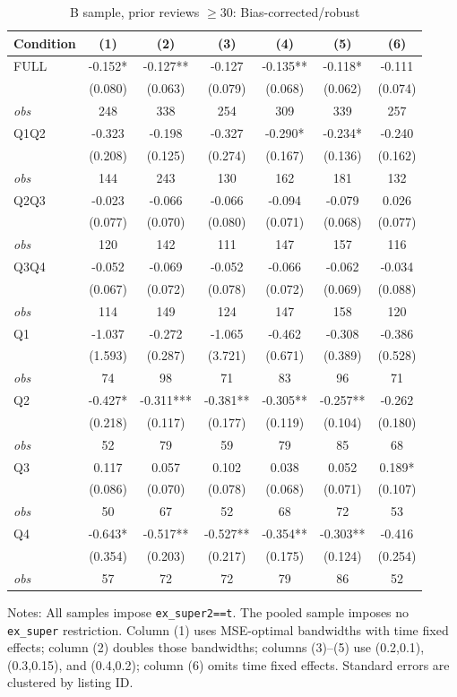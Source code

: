 \begin{table}[!htbp]
\centering
\caption{B sample, prior reviews $\geq30$: Bias-corrected/robust}
\begin{tabular}{lcccccc}
\toprule
Condition & (1) & (2) & (3) & (4) & (5) & (6) \\
\midrule
FULL & -0.152* & -0.127** & -0.127 & -0.135** & -0.118* & -0.111 \\
 & (0.080) & (0.063) & (0.079) & (0.068) & (0.062) & (0.074) \\
\textit{obs} & 248 & 338 & 254 & 309 & 339 & 257 \\
Q1Q2 & -0.323 & -0.198 & -0.327 & -0.290* & -0.234* & -0.240 \\
 & (0.208) & (0.125) & (0.274) & (0.167) & (0.136) & (0.162) \\
\textit{obs} & 144 & 243 & 130 & 162 & 181 & 132 \\
Q2Q3 & -0.023 & -0.066 & -0.066 & -0.094 & -0.079 & 0.026 \\
 & (0.077) & (0.070) & (0.080) & (0.071) & (0.068) & (0.077) \\
\textit{obs} & 120 & 142 & 111 & 147 & 157 & 116 \\
Q3Q4 & -0.052 & -0.069 & -0.052 & -0.066 & -0.062 & -0.034 \\
 & (0.067) & (0.072) & (0.078) & (0.072) & (0.069) & (0.088) \\
\textit{obs} & 114 & 149 & 124 & 147 & 158 & 120 \\
Q1 & -1.037 & -0.272 & -1.065 & -0.462 & -0.308 & -0.386 \\
 & (1.593) & (0.287) & (3.721) & (0.671) & (0.389) & (0.528) \\
\textit{obs} & 74 & 98 & 71 & 83 & 96 & 71 \\
Q2 & -0.427* & -0.311*** & -0.381** & -0.305** & -0.257** & -0.262 \\
 & (0.218) & (0.117) & (0.177) & (0.119) & (0.104) & (0.180) \\
\textit{obs} & 52 & 79 & 59 & 79 & 85 & 68 \\
Q3 & 0.117 & 0.057 & 0.102 & 0.038 & 0.052 & 0.189* \\
 & (0.086) & (0.070) & (0.078) & (0.068) & (0.071) & (0.107) \\
\textit{obs} & 50 & 67 & 52 & 68 & 72 & 53 \\
Q4 & -0.643* & -0.517** & -0.527** & -0.354** & -0.303** & -0.416 \\
 & (0.354) & (0.203) & (0.217) & (0.175) & (0.124) & (0.254) \\
\textit{obs} & 57 & 72 & 72 & 79 & 86 & 52 \\
\bottomrule
\end{tabular}
\begin{minipage}{0.98\textwidth}\footnotesize
Notes: All samples impose \texttt{ex\_super2==t}. The pooled sample imposes no \texttt{ex\_super} restriction. Column (1) uses MSE-optimal bandwidths with time fixed effects; column (2) doubles those bandwidths; columns (3)--(5) use (0.2,0.1), (0.3,0.15), and (0.4,0.2); column (6) omits time fixed effects. Standard errors are clustered by listing ID.
\end{minipage}
\end{table}

